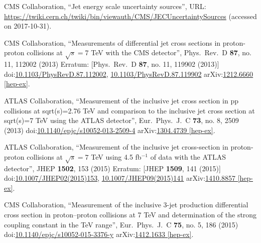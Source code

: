 \begin{thebibliography}{99}
CMS Collaboration, ``Jet energy scale uncertainty sources'', URL: \url{https://twiki.cern.ch/twiki/bin/viewauth/CMS/JECUncertaintySources} (accessed on 2017-10-31).

CMS Collaboration, ``Measurements of differential jet cross sections in proton-proton collisions at $\sqrt{s}=7$ TeV with the CMS detector'', Phys.\ Rev.\ D {\bf 87}, no. 11, 112002 (2013) Erratum: [Phys.\ Rev.\ D {\bf 87}, no. 11, 119902 (2013)] doi:\href{http://dx.doi.org/10.1103/PhysRevD.87.112002}{10.1103/PhysRevD.87.112002}, \href{http://dx.doi.org/10.1103/PhysRevD.87.119902}{10.1103/PhysRevD.87.119902} arXiv:\href{https://arxiv.org/abs/1212.6660}{1212.6660 [hep-ex]}.




ATLAS Collaboration, ``Measurement of the inclusive jet cross section in pp collisions at sqrt(s)=2.76 TeV and comparison to the inclusive jet cross section at sqrt(s)=7 TeV using the ATLAS detector'', Eur.\ Phys.\ J.\ C {\bf 73}, no. 8, 2509 (2013) doi:\href{http://dx.doi.org/10.1140/epjc/s10052-013-2509-4}{10.1140/epjc/s10052-013-2509-4} arXiv:\href{https://arxiv.org/abs/1304.4739}{1304.4739 [hep-ex]}.
 
ATLAS Collaboration, ``Measurement of the inclusive jet cross-section in proton-proton collisions at $ \sqrt{s}=7 $ TeV using 4.5 fb$^{-1}$ of data with the ATLAS detector'', JHEP {\bf 1502}, 153 (2015) Erratum: [JHEP {\bf 1509}, 141 (2015)] doi:\href{http://dx.doi.org/10.1007/JHEP02(2015)153}{10.1007/JHEP02(2015)153}, \href{http://dx.doi.org/10.1007/JHEP09(2015)141}{10.1007/JHEP09(2015)141} arXiv:\href{https://arxiv.org/abs/1410.8857}{1410.8857 [hep-ex]}.

CMS Collaboration, ``Measurement of the inclusive 3-jet production differential cross section in proton–proton collisions at 7 TeV and determination of the strong coupling constant in the TeV range'', Eur.\ Phys.\ J.\ C {\bf 75}, no. 5, 186 (2015) doi:\href{http://dx.doi.org/10.1140/epjc/s10052-015-3376-y}{10.1140/epjc/s10052-015-3376-y} arXiv:\href{https://arxiv.org/abs/1412.1633}{1412.1633 [hep-ex]}.


\end{thebibliography}
